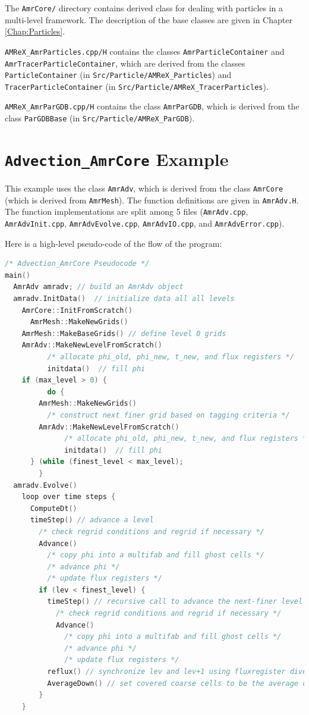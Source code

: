 The {\tt AmrCore/} directory contains derived class for dealing with particles 
in a multi-level framework.  The description of the base classes
are given in Chapter \ref{Chap:Particles}.

{\tt AMReX\_AmrParticles.cpp/H} contains the classes {\tt AmrParticleContainer}
and {\tt AmrTracerParticleContainer}, which are derived from the classes
{\tt ParticleContainer} (in {\tt Src/Particle/AMReX\_Particles})
and {\tt TracerParticleContainer} (in {\tt Src/Particle/AMReX\_TracerParticles}).

{\tt AMReX\_AmrParGDB.cpp/H} contains the class {\tt AmrParGDB}, which is derived from
the class {\tt ParGDBBase} (in {\tt Src/Particle/AMReX\_ParGDB}).

\section{{\tt Advection\_AmrCore} Example}
This example uses the class {\tt AmrAdv}, which is derived from the class {\tt AmrCore} 
(which is derived from {\tt AmrMesh}).  The function definitions are given in {\tt AmrAdv.H}.
The function implementations are split among 5 files 
({\tt AmrAdv.cpp}, {\tt AmrAdvInit.cpp}, {\tt AmrAdvEvolve.cpp}, {\tt AmrAdvIO.cpp}, and {\tt AmrAdvError.cpp}).

Here is a high-level pseudo-code of the flow of the program:
\begin{lstlisting}[language=cpp]
/* Advection_AmrCore Pseudocode */
main()
  AmrAdv amradv; // build an AmrAdv object
  amradv.InitData()  // initialize data all all levels
    AmrCore::InitFromScratch()
      AmrMesh::MakeNewGrids()
	AmrMesh::MakeBaseGrids() // define level 0 grids
	AmrAdv::MakeNewLevelFromScratch()
          /* allocate phi_old, phi_new, t_new, and flux registers */
          initdata()  // fill phi
	if (max_level > 0) {
          do {
  	    AmrMesh::MakeNewGrids()
	      /* construct next finer grid based on tagging criteria */
 	    AmrAdv::MakeNewLevelFromScratch()
              /* allocate phi_old, phi_new, t_new, and flux registers */
              initdata()  // fill phi
	  } (while (finest_level < max_level);
        }
  amradv.Evolve()
    loop over time steps {
      ComputeDt()
      timeStep() // advance a level
        /* check regrid conditions and regrid if necessary */
        Advance()
          /* copy phi into a multifab and fill ghost cells */
          /* advance phi */
          /* update flux registers */
        if (lev < finest_level) {
          timeStep() // recursive call to advance the next-finer level "r" times
            /* check regrid conditions and regrid if necessary */
            Advance()
              /* copy phi into a multifab and fill ghost cells */
              /* advance phi */
              /* update flux registers */
          reflux() // synchronize lev and lev+1 using fluxregister divergence
          AverageDown() // set covered coarse cells to be the average of fine
        }
    }
\end{lstlisting}


